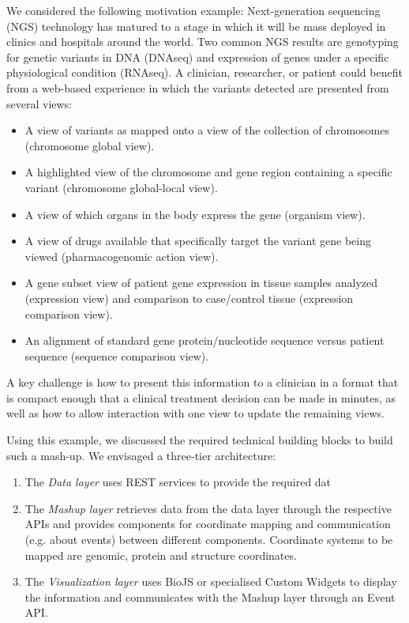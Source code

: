 \documentclass[a4paper]{article}
\begin{document}
We considered the following motivation example: Next-generation sequencing (NGS) technology has matured to a stage in which it will be mass deployed in clinics and hospitals around the world.  Two common NGS results are genotyping for genetic variants in DNA (DNAseq) and expression of genes under a specific physiological condition (RNAseq).  
A clinician, researcher, or patient could benefit from a web-based experience in which the variants detected are presented from several views:
\begin{itemize}
\item A view of variants as mapped onto a view of the collection of chromosomes (chromosome global view).
\item A highlighted view of the chromosome and gene region containing a specific variant (chromosome global-local view).
\item A view of which organs in the body express the gene (organism view).
\item A view of drugs available that specifically target the variant gene being viewed (pharmacogenomic action view).
\item A gene subset view of patient gene expression in tissue samples analyzed (expression view) and comparison to case/control tissue (expression comparison view).
\item An alignment of standard gene protein/nucleotide sequence versus patient sequence (sequence comparison view).
\end{itemize}
A key challenge is how to present this information to a clinician in a format that is compact enough that a clinical treatment decision can be made in minutes, as well as how to allow interaction with one view to update the remaining views.

Using this example, we discussed the required technical building blocks to build such a mash-up. We envisaged a three-tier architecture: 
\begin{enumerate}
\item The \emph{Data layer} uses REST services to provide the required dat 
\item The \emph{Mashup layer} retrieves data from the data layer through the respective APIs and provides components for coordinate mapping and communication (e.g. about events) between different components. Coordinate systems to be mapped are genomic, protein and structure coordinates.
\item The \emph{Visualization layer} uses BioJS or specialised Custom Widgets to display the information and communicates with the Mashup layer through an Event API.
\end{enumerate}
\end{document}
